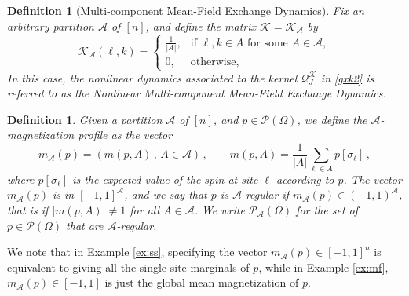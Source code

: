 \documentclass[11pt,reqno]{amsart}
\numberwithin{equation}{section}
\numberwithin{figure}{section}
\newtheorem{definition}[theorem]{Definition}
\newcommand{\1}{\mathds{1}}
\let\si=\sigma
\newcommand{\cA}{\ensuremath{\mathcal A}}
\newcommand{\cK}{\ensuremath{\mathcal K}}
\begin{document}
\begin{definition}[Multi-component Mean-Field Exchange Dynamics]   \label{ex:mcmf}
Fix an arbitrary partition $\cA$ of $[n]$, and define the matrix $\cK=\cK_\cA$ by 
\begin{equation}\label{eq:meanf0}
        \mathcal{K}_\cA(\ell, k) = 
        \begin{cases}
            \frac1{|A|}, & \text{if } \ell, k \in A \text{ for some } A \in \mathcal{A}, \\
            0, & \text{otherwise},
        \end{cases}
    \end{equation}
    In this case, the nonlinear dynamics associated to the kernel $\mathcal{Q}_J^\mathcal{K}$ in \eqref{gxk2} is referred to as the Nonlinear Multi-component Mean-Field Exchange Dynamics.
 \end{definition}
\begin{definition}\label{def:Amag}
Given a partition $\cA$ of $[n]$, and $p \in \mathcal{P}(\Omega)$, we define the $\cA$-\emph{magnetization profile} as the  vector
\begin{equation}\label{eq:Amag}
m_\cA(p) = (m(p,A)\,,\, A\in \cA)\,,\qquad  m(p,A) = \frac1{|A|}\sum_{\ell\in A}p[\si_\ell]\,,
            \end{equation}
            where $p[\si_\ell]$ is the expected value of the spin at site $\ell$ according to $p$.
            The vector $m_\cA(p) $ is in  $[-1,1]^\cA$, and we say that $p$ is $\cA$-{\em regular} if $m_\cA(p)\in(-1,1)^\cA$, that is if $|m(p,A)|\neq 1 $ for all $A\in \cA$. We write $\mathcal{P}_\cA(\Omega)$ for the set of $p \in \mathcal{P}(\Omega)$ that are $\cA$-regular. 
\end{definition}
We note that in Example \ref{ex:ss}, specifying the vector $m_\cA(p)\in[-1,1]^n$ is
equivalent to giving all the single-site marginals of $p$, while in Example \ref{ex:mf}, $m_\cA(p)\in[-1,1]$ is just the global mean magnetization of $p$.  
\end{document}
